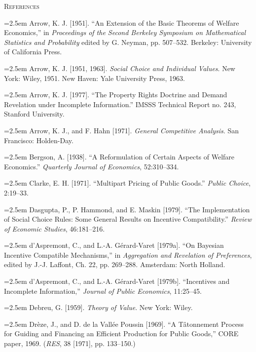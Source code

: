 \documentclass[12pt, letterpaper]{article}
\newcommand{\bibentry}[1]{\noindent\hangindent=2.5em\hangafter=1 \small #1 \par\vspace{0.75em}}
\begin{document}
\vspace{1.5cm}

\begin{center}
    {\large\scshape\color{MidnightBlue} References}
    \vspace{0.8cm}
\end{center}

\bibentry{Arrow, K. J. [1951]. ``An Extension of the Basic Theorems of Welfare Economics,'' in \textit{Proceedings of the Second Berkeley Symposium on Mathematical Statistics and Probability} edited by G. Neyman, pp. 507--532. Berkeley: University of California Press.}

\bibentry{Arrow, K. J. [1951, 1963]. \textit{Social Choice and Individual Values}. New York: Wiley, 1951. New Haven: Yale University Press, 1963.}

\bibentry{Arrow, K. J. [1977]. ``The Property Rights Doctrine and Demand Revelation under Incomplete Information.'' IMSSS Technical Report no. 243, Stanford University.}

\bibentry{Arrow, K. J., and F. Hahn [1971]. \textit{General Competitive Analysis}. San Francisco: Holden-Day.}

\bibentry{Bergson, A. [1938]. ``A Reformulation of Certain Aspects of Welfare Economics.'' \textit{Quarterly Journal of Economics}, 52:310--334.}

\bibentry{Clarke, E. H. [1971]. ``Multipart Pricing of Public Goods.'' \textit{Public Choice}, 2:19--33.}

\bibentry{Dasgupta, P., P. Hammond, and E. Maskin [1979]. ``The Implementation of Social Choice Rules: Some General Results on Incentive Compatibility.'' \textit{Review of Economic Studies}, 46:181--216.}

\bibentry{d'Aspremont, C., and L.-A. Gérard-Varet [1979a]. ``On Bayesian Incentive Compatible Mechanisms,'' in \textit{Aggregation and Revelation of Preferences}, edited by J.-J. Laffont, Ch. 22, pp. 269--288. Amsterdam: North Holland.}

\bibentry{d'Aspremont, C., and L.-A. Gérard-Varet [1979b]. ``Incentives and Incomplete Information,'' \textit{Journal of Public Economics}, 11:25--45.}

\bibentry{Debreu, G. [1959]. \textit{Theory of Value}. New York: Wiley.}

\bibentry{Drèze, J., and D. de la Vallée Poussin [1969]. ``A Tâtonnement Process for Guiding and Financing an Efficient Production for Public Goods,'' CORE paper, 1969. (\textit{RES}, 38 [1971], pp. 133--150.)}
\end{document}
